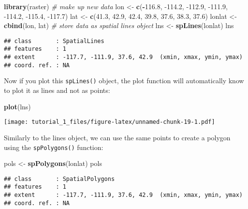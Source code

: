 \documentclass[]{article}
\newenvironment{Shaded}{\begin{snugshade}}{\end{snugshade}}
\newcommand{\CommentTok}[1]{\textcolor[rgb]{0.56,0.35,0.01}{\textit{#1}}}
\newcommand{\FloatTok}[1]{\textcolor[rgb]{0.00,0.00,0.81}{#1}}
\newcommand{\KeywordTok}[1]{\textcolor[rgb]{0.13,0.29,0.53}{\textbf{#1}}}
\newcommand{\NormalTok}[1]{#1}
\newcommand{\OperatorTok}[1]{\textcolor[rgb]{0.81,0.36,0.00}{\textbf{#1}}}
\newcommand{\StringTok}[1]{\textcolor[rgb]{0.31,0.60,0.02}{#1}}
\begin{document}
\begin{Shaded}
\begin{Highlighting}[]
\KeywordTok{library}\NormalTok{(raster)}
\CommentTok{# make up new data}
\NormalTok{lon <-}\StringTok{ }\KeywordTok{c}\NormalTok{(}\OperatorTok{-}\FloatTok{116.8}\NormalTok{, }\FloatTok{-114.2}\NormalTok{, }\FloatTok{-112.9}\NormalTok{, }\FloatTok{-111.9}\NormalTok{, }\FloatTok{-114.2}\NormalTok{, }\FloatTok{-115.4}\NormalTok{, }\FloatTok{-117.7}\NormalTok{)}
\NormalTok{lat <-}\StringTok{ }\KeywordTok{c}\NormalTok{(}\FloatTok{41.3}\NormalTok{, }\FloatTok{42.9}\NormalTok{, }\FloatTok{42.4}\NormalTok{, }\FloatTok{39.8}\NormalTok{, }\FloatTok{37.6}\NormalTok{, }\FloatTok{38.3}\NormalTok{, }\FloatTok{37.6}\NormalTok{)}
\NormalTok{lonlat <-}\StringTok{ }\KeywordTok{cbind}\NormalTok{(lon, lat)}
\CommentTok{# store data as spatial lines object}
\NormalTok{lns <-}\StringTok{ }\KeywordTok{spLines}\NormalTok{(lonlat)}
\NormalTok{lns}
\end{Highlighting}
\end{Shaded}

\begin{verbatim}
## class       : SpatialLines 
## features    : 1 
## extent      : -117.7, -111.9, 37.6, 42.9  (xmin, xmax, ymin, ymax)
## coord. ref. : NA
\end{verbatim}

Now if you plot this \texttt{spLines()} object, the plot function will
automatically know to plot it as lines and not as points:

\begin{Shaded}
\begin{Highlighting}[]
\KeywordTok{plot}\NormalTok{(lns)}
\end{Highlighting}
\end{Shaded}

\texttt{[image: tutorial\_1\_files/figure-latex/unnamed-chunk-19-1.pdf]}

Similarly to the lines object, we can use the same points to create a
polygon using the \texttt{spPolygons()} function:

\begin{Shaded}
\begin{Highlighting}[]
\NormalTok{pols <-}\StringTok{ }\KeywordTok{spPolygons}\NormalTok{(lonlat)}
\NormalTok{pols}
\end{Highlighting}
\end{Shaded}

\begin{verbatim}
## class       : SpatialPolygons 
## features    : 1 
## extent      : -117.7, -111.9, 37.6, 42.9  (xmin, xmax, ymin, ymax)
## coord. ref. : NA
\end{verbatim}
\end{document}

